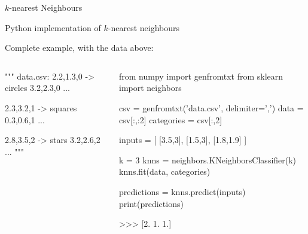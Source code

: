 \documentclass[compress,xcolor=table]{beamer}
\begin{document}
\begin{frame}{$k$-nearest Neighbours}
\begin{center}
{
        }
    \end{center}

\end{frame}

\begin{frame}[fragile]{Python implementation of $k$-nearest neighbours}

    Complete example, with the data above:

\begin{columns}
    \begin{column}{0.4\linewidth}
\begin{pythoncode}
""" data.csv:
2.2,1.3,0 -> circles
3.2,2.3,0
...

2.3,3.2,1 -> squares
0.3,0.6,1
...

2.8,3.5,2 -> stars
3.2,2.6,2
...
"""
\end{pythoncode}
        
    \end{column}
    \begin{column}{0.6\linewidth}
\begin{pythoncode}
from numpy import genfromtxt
from sklearn import neighbors

csv = genfromtxt('data.csv', delimiter=',')
data = csv[:,:2]
categories = csv[:,2]

inputs = [ [3.5,3], [1.5,3], [1.8,1.9] ]

k = 3
knns = neighbors.KNeighborsClassifier(k)
knns.fit(data, categories)

predictions = knns.predict(inputs)
print(predictions)

>>>  [2.  1.  1.]

\end{pythoncode}
    \end{column}
\end{columns}



\end{frame}
\end{document}
